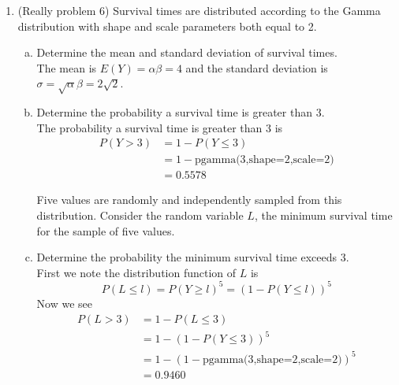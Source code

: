 \documentclass{scrartcl}
\begin{document}
\begin{enumerate}








\item (Really problem 6) Survival times are distributed according to the Gamma distribution with shape and scale parameters both equal to 2.

  \begin{enumerate}[a)]
  \item Determine the mean and standard deviation of survival times.\\
    The mean is $E(Y) = \alpha\beta = 4$ and the standard deviation is $\sigma = \sqrt{\alpha}\beta = 2\sqrt{2}$.

  \item Determine the probability a survival time is greater than 3.\\
    The probability a survival time is greater than 3 is
    \begin{align*}
      P(Y > 3) &= 1 - P(Y \le 3)\\
      &= 1 - \text{pgamma(3,shape=2,scale=2)}\\
      &= 0.5578
    \end{align*}

    Five values are randomly and independently sampled from this distribution. Consider the random variable $L$, the minimum survival time for the sample of five values.

  \item Determine the probability the minimum survival time exceeds 3.\\
    
    First we note the distribution function of $L$ is $$P(L \le l) = P(Y \ge l)^5 = \left(1 - P(Y \le l)\right)^5$$ Now we see 
    \begin{align*}
      P(L > 3) &= 1 - P(L \le 3)\\
      &= 1 - \left(1 - P(Y \le 3)\right)^5\\
      &= 1 - \left(1 - \text{pgamma(3,shape=2,scale=2)}\right)^5\\
      &= 0.9460
    \end{align*}
    

\end{enumerate}
\end{enumerate}
\end{document}
